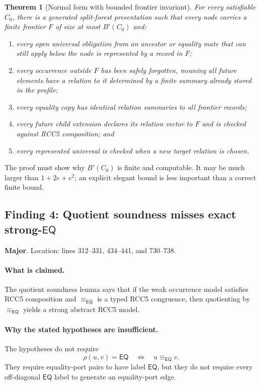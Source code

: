 \documentclass[11pt]{article}
\newcommand{\EQ}{\mathsf{EQ}}
\newtheorem{theorem}{Theorem}
\newcommand{\Major}{\textbf{\textcolor{maj}{Major}}}
\begin{document}
\begin{theorem}[Normal form with bounded frontier invariant]
For every satisfiable $C_0$, there is a generated split-forest presentation such that every node carries a finite frontier $F$ of size at most $B'(C_0)$ and:
\begin{enumerate}[label=(F\arabic*)]
\item every open universal obligation from an ancestor or equality mate that can still apply below the node is represented by a record in $F$;
\item every occurrence outside $F$ has been safely forgotten, meaning all future elements have a relation to it determined by a finite summary already stored in the profile;
\item every equality copy has identical relation summaries to all frontier records;
\item every future child extension declares its relation vector to $F$ and is checked against RCC5 composition; and
\item every represented universal is checked when a new target relation is chosen.
\end{enumerate}
\end{theorem}

The proof must show why $B'(C_0)$ is finite and computable.  It may be much larger than $1+2e+e^2$; an explicit elegant bound is less important than a correct finite bound.

\subsection{Finding 4: Quotient soundness misses exact strong-$\EQ$}

\noindent\Major.  Location: lines 312--331, 434--441, and 730--738.

\paragraph{What is claimed.}
The quotient soundness lemma says that if the weak occurrence model satisfies RCC5 composition and $\equiv_{\EQ}$ is a typed RCC5 congruence, then quotienting by $\equiv_{\EQ}$ yields a strong abstract RCC5 model.

\paragraph{Why the stated hypotheses are insufficient.}
The hypotheses do not require
\[
  \rho(u,v)=\EQ \quad\Longleftrightarrow\quad u\equiv_{\EQ}v.
\]
They require equality-port pairs to have label $\EQ$, but they do not require every off-diagonal $\EQ$ label to generate an equality-port edge.
\end{document}
